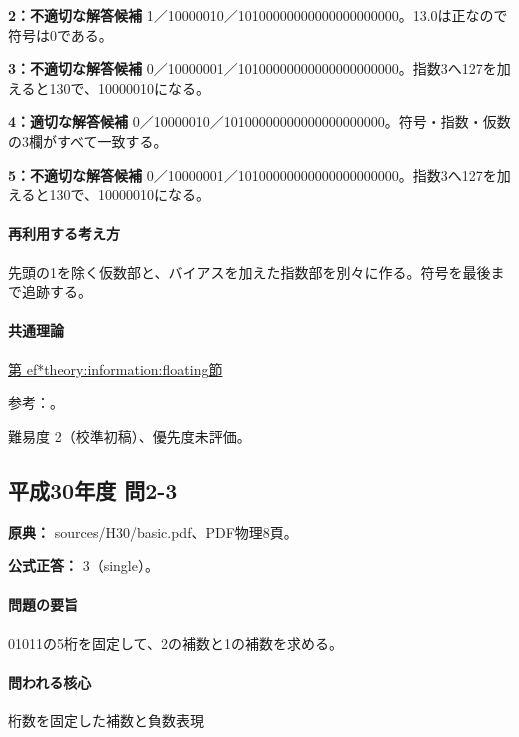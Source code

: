 \noindent\textbf{2：不適切な解答候補} 1／10000010／10100000000000000000000。13.0は正なので符号は0である。\par

\noindent\textbf{3：不適切な解答候補} 0／10000001／10100000000000000000000。指数3へ127を加えると130で、10000010になる。\par

\noindent\textbf{4：適切な解答候補} 0／10000010／10100000000000000000000。符号・指数・仮数の3欄がすべて一致する。\par

\noindent\textbf{5：不適切な解答候補} 0／10000001／10100000000000000000000。指数3へ127を加えると130で、10000010になる。\par

\paragraph{再利用する考え方} 先頭の1を除く仮数部と、バイアスを加えた指数部を別々に作る。符号を最後まで追跡する。

\paragraph{共通理論} \hyperref[theory:information:floating]{第
ef*{theory:information:floating}節}

\par 参考：\cite{oracle_single}。

\par 難易度 2（校準初稿）、優先度未評価。

\subsection{平成30年度 問2-3}
\label{q:h30-reg-basic-2-3}

\noindent\textbf{原典：} sources/H30/basic.pdf、PDF物理8頁。

\textbf{公式正答：} 3（single）。

\paragraph{問題の要旨} 01011の5桁を固定して、2の補数と1の補数を求める。

\paragraph{問われる核心} 桁数を固定した補数と負数表現

